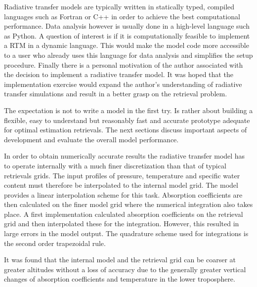     Radiative transfer models are typically written in statically typed,
    compiled languages such as Fortran or C++ in order to achieve the best
    computational performance. Data analysis however is usually done in
    a high-level language such as Python. A question of interest is if it is
    computationally feasible to implement a RTM in a dynamic language. This
    would make the model code more accessible to a user who already uses this
    language for data analysis and simplifies the setup procedure. Finally
    there is a personal motivation of the author associated with the decision
    to implement a radiative transfer model. It was hoped that the
    implementation exercise would expand the author's understanding of
    radiative transfer simulations and result in a better grasp on the
    retrieval problem.

    The expectation is not to write a  model in the first try.
    Is rather about building a flexible, easy to understand but reasonably fast
    and accurate prototype adequate for optimal estimation retrievals. The next
    sections discuss important aspects of development and evaluate the overall
    model performance.

\stopsubsection

\startsubsection[title=Numerical Considerations]

    In order to obtain numerically accurate results the radiative transfer
    model has to operate internally with a much finer discretization than that
    of typical retrievals grids. The input profiles of pressure, temperature
    and specific water content must therefore be interpolated to the internal
    model grid. The model provides a linear interpolation scheme for this task.
    Absorption coefficients are then calculated on the finer model grid where
    the numerical integration also takes place. A first implementation
    calculated absorption coefficients on the retrieval grid and then
    interpolated these for the integration. However, this resulted in large errors in
    the model output. The quadrature scheme used for integrations is the second
    order trapezoidal rule.

    It was found that the internal model and the retrieval grid can be coarser
    at greater altitudes without a loss of accuracy due to the generally
    greater vertical changes of absorption coefficients and temperature in the
    lower troposphere.

\stopsubsection

